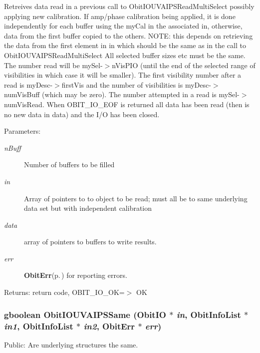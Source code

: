 Retreives data read in a previous call to Obit\-IOUVAIPSRead\-Multi\-Select possibly applying new calibration. If amp/phase calibration being applied, it is done independently for each buffer using the my\-Cal in the associated in, otherwise, data from the first buffer copied to the others. NOTE: this depends on retrieving the data from the first element in in which should be the same as in the call to Obit\-IOUVAIPSRead\-Multi\-Select All selected buffer sizes etc must be the same. The number read will be my\-Sel-$>$n\-Vis\-PIO (until the end of the selected range of visibilities in which case it will be smaller). The first visibility number after a read is my\-Desc-$>$first\-Vis and the number of visibilities is my\-Desc-$>$num\-Vis\-Buff (which may be zero). The number attempted in a read is my\-Sel-$>$num\-Vis\-Read. When OBIT\_\-IO\_\-EOF is returned all data has been read (then is no new data in data) and the I/O has been closed. \begin{Desc}
\item[Parameters:]
\begin{description}
\item[{\em n\-Buff}]Number of buffers to be filled \item[{\em in}]Array of pointers to to object to be read; must all be to same underlying data set but with independent calibration \item[{\em data}]array of pointers to buffers to write results. \item[{\em err}]{\bf Obit\-Err}{\rm (p.\,\pageref{structObitErr})} for reporting errors. \end{description}
\end{Desc}
\begin{Desc}
\item[Returns:]return code, OBIT\_\-IO\_\-OK=$>$ OK \end{Desc}
\subsubsection{\setlength{\rightskip}{0pt plus 5cm}gboolean Obit\-IOUVAIPSSame ({\bf Obit\-IO} $\ast$ {\em in}, {\bf Obit\-Info\-List} $\ast$ {\em in1}, {\bf Obit\-Info\-List} $\ast$ {\em in2}, {\bf Obit\-Err} $\ast$ {\em err})}\label{ObitIOUVAIPS_8h_a6}


Public: Are underlying structures the same. 

